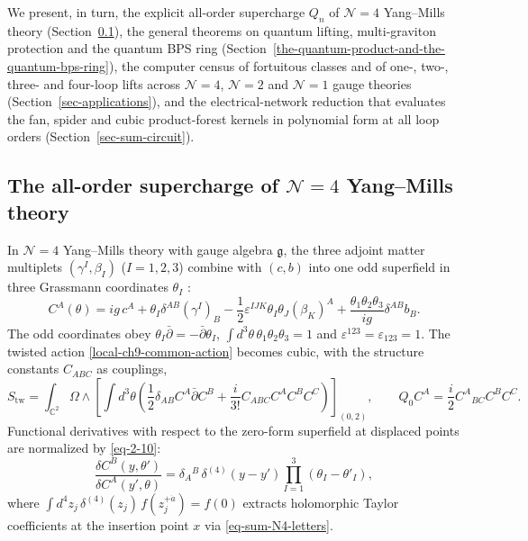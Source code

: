 \documentclass[11pt]{article}
\numberwithin{equation}{section}
\numberwithin{figure}{section}
\numberwithin{table}{section}
\begin{document}
We present, in turn, the explicit all-order supercharge $Q_n$ of $\mathcal N=4$ Yang--Mills theory (Section~\ref{the-all-order-supercharge-of-mathcal-n4-yangmills-theory}), the general theorems on quantum lifting, multi-graviton protection and the quantum BPS ring (Section~\ref{the-quantum-product-and-the-quantum-bps-ring}), the computer census of fortuitous classes and of one-, two-, three- and four-loop lifts across $\mathcal N=4$, $\mathcal N=2$ and $\mathcal N=1$ gauge theories (Section~\ref{sec-applications}), and the electrical-network reduction that evaluates the fan, spider and cubic product-forest kernels in polynomial form at all loop orders (Section~\ref{sec-sum-circuit}).

\subsection{The all-order supercharge of \texorpdfstring{$\mathcal N=4$}{N=4} Yang--Mills theory}\label{the-all-order-supercharge-of-mathcal-n4-yangmills-theory}

In $\mathcal N=4$ Yang--Mills theory with gauge algebra $\mathfrak g$, the three adjoint matter multiplets $(\gamma^I,\beta_I)$ ($I=1,2,3$) combine with $(c,b)$ into one odd superfield in three Grassmann coordinates $\theta_I$ \cite{ChangYin,BK}:
\begin{equation*}
C^A(\theta)=ig\,c^A+\theta_I\delta^{AB}(\gamma^I)_B-\frac12\varepsilon^{IJK}\theta_I\theta_J(\beta_K)^A+\frac{\theta_1\theta_2\theta_3}{ig}\delta^{AB}b_B.
\end{equation*}
The odd coordinates obey $\theta_I\bar\partial=-\bar\partial\theta_I$, $\int d^3\theta\,\theta_1\theta_2\theta_3=1$ and $\varepsilon^{123}=\varepsilon_{123}=1$. The twisted action \eqref{local-ch9-common-action} becomes cubic, with the structure constants $C_{ABC}$ as couplings,
\begin{equation}\label{local-ch9-su-action}
S_{\mathrm{tw}}=\int_{\mathbb C^2}\Omega\wedge
\left[\int d^3\theta\left(\frac12\delta_{AB}C^A\bar\partial C^B
+\frac{i}{3!}C_{ABC}C^AC^BC^C\right)\right]_{(0,2)},
\qquad Q_0C^A=\frac i2C^A{}_{BC}C^BC^C.
\end{equation}
Functional derivatives with respect to the zero-form superfield at displaced points are normalized by \eqref{eq-2-10}:
\begin{equation}\label{eq-sum-deltaC-norm}
\frac{\delta C^B(y,\theta')}{\delta C^A(y',\theta)}
=\delta_A{}^B\,\delta^{(4)}(y-y')\prod_{I=1}^3(\theta_I-\theta'_I),
\end{equation}
where $\int d^4z_j\,\delta^{(4)}(z_j)\,f(z_j^{+\dot a})=f(0)$ extracts holomorphic Taylor coefficients at the insertion point $x$ via \eqref{eq-sum-N4-letters}.
\end{document}
